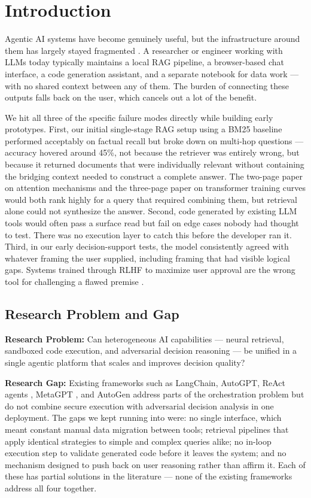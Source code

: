 \documentclass[conference]{IEEEtran}
\begin{document}
\section{Introduction}

Agentic AI systems have become genuinely useful, but the infrastructure around them has largely stayed fragmented \cite{wang2023agents, openai2023gpt4}. A researcher or engineer working with LLMs today typically maintains a local RAG pipeline, a browser-based chat interface, a code generation assistant, and a separate notebook for data work --- with no shared context between any of them. The burden of connecting these outputs falls back on the user, which cancels out a lot of the benefit.

We hit all three of the specific failure modes directly while building early prototypes. First, our initial single-stage RAG setup using a BM25 baseline performed acceptably on factual recall but broke down on multi-hop questions --- accuracy hovered around 45\%, not because the retriever was entirely wrong, but because it returned documents that were individually relevant without containing the bridging context needed to construct a complete answer. The two-page paper on attention mechanisms and the three-page paper on transformer training curves would both rank highly for a query that required combining them, but retrieval alone could not synthesize the answer. Second, code generated by existing LLM tools \cite{roziere2023codellama, li2023starcoder} would often pass a surface read but fail on edge cases nobody had thought to test. There was no execution layer to catch this before the developer ran it. Third, in our early decision-support tests, the model consistently agreed with whatever framing the user supplied, including framing that had visible logical gaps. Systems trained through RLHF to maximize user approval are the wrong tool for challenging a flawed premise \cite{zheng2023judging}.

\subsection{Research Problem and Gap}

\textbf{Research Problem:} Can heterogeneous AI capabilities --- neural retrieval, sandboxed code execution, and adversarial decision reasoning --- be unified in a single agentic platform that scales and improves decision quality?

\textbf{Research Gap:} Existing frameworks such as LangChain, AutoGPT, ReAct agents \cite{yao2022react}, MetaGPT \cite{hong2023metagpt}, and AutoGen \cite{wu2023autogen} address parts of the orchestration problem \cite{wang2023agents} but do not combine secure execution with adversarial decision analysis in one deployment. The gaps we kept running into were: no single interface, which meant constant manual data migration between tools; retrieval pipelines that apply identical strategies to simple and complex queries alike; no in-loop execution step to validate generated code before it leaves the system; and no mechanism designed to push back on user reasoning rather than affirm it. Each of these has partial solutions in the literature --- none of the existing frameworks address all four together.
\end{document}
